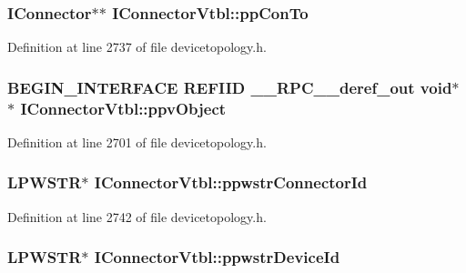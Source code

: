 \subsubsection[{\texorpdfstring{pp\+Con\+To}{ppConTo}}]{ {\bf I\+Connector}$\ast$$\ast$ I\+Connector\+Vtbl\+::pp\+Con\+To}\hypertarget{struct_i_connector_vtbl_afe4f6f5bd1675289f3687670ec9196b6}{}\label{struct_i_connector_vtbl_afe4f6f5bd1675289f3687670ec9196b6}


Definition at line 2737 of file devicetopology.\+h.

\subsubsection[{\texorpdfstring{ppv\+Object}{ppvObject}}]{\setlength{\rightskip}{0pt plus 5cm}B\+E\+G\+I\+N\+\_\+\+I\+N\+T\+E\+R\+F\+A\+CE {\bf R\+E\+F\+I\+ID} {\bf \+\_\+\+\_\+\+R\+P\+C\+\_\+\+\_\+deref\+\_\+out} {\bf void}$\ast$$\ast$ I\+Connector\+Vtbl\+::ppv\+Object}\hypertarget{struct_i_connector_vtbl_a5de0485de0f12318fb7567432c725c37}{}\label{struct_i_connector_vtbl_a5de0485de0f12318fb7567432c725c37}


Definition at line 2701 of file devicetopology.\+h.

\subsubsection[{\texorpdfstring{ppwstr\+Connector\+Id}{ppwstrConnectorId}}]{ {\bf L\+P\+W\+S\+TR}$\ast$ I\+Connector\+Vtbl\+::ppwstr\+Connector\+Id}\hypertarget{struct_i_connector_vtbl_a328e9302de134490233ed45553bb2a12}{}\label{struct_i_connector_vtbl_a328e9302de134490233ed45553bb2a12}


Definition at line 2742 of file devicetopology.\+h.

\subsubsection[{\texorpdfstring{ppwstr\+Device\+Id}{ppwstrDeviceId}}]{ {\bf L\+P\+W\+S\+TR}$\ast$ I\+Connector\+Vtbl\+::ppwstr\+Device\+Id}\hypertarget{struct_i_connector_vtbl_ab039c22ccf7076e5e9d8f3a79ff796ce}{}\label{struct_i_connector_vtbl_ab039c22ccf7076e5e9d8f3a79ff796ce}


